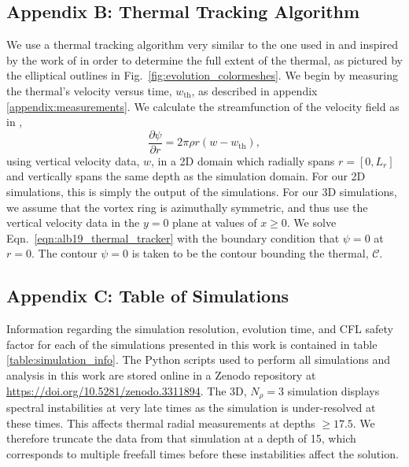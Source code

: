 \subsection{Appendix B: Thermal Tracking Algorithm}
\label{appendix:tracking}
We use a thermal tracking algorithm very similar to the one used in  \citet{lecoanet&jeevanjee2018} and inspired by the work of \citet{romps&all2015} in order to determine the full extent of the thermal, as pictured by the elliptical outlines in Fig.~\ref{fig:evolution_colormeshes}. 
We begin by measuring the thermal's velocity versus time, $w_{\text{th}}$, as described in appendix \ref{appendix:measurements}. 
We calculate the streamfunction of the velocity field as in \citet{romps&all2015},
\begin{equation}
\frac{\partial \psi}{\partial r} = 2\pi \rho r (w - w_{\text{th}}),
\label{eqn:alb19_thermal_tracker}
\end{equation}
using vertical velocity data, $w$, in a 2D domain which radially spans $r = [0, L_r]$ and vertically spans the same depth as the simulation domain.
For our 2D simulations, this is simply the output of the simulations.
For our 3D simulations, we assume that the vortex ring is azimuthally symmetric, and thus use the vertical velocity data in the $y = 0$ plane at values of $x \geq 0$.
We solve Eqn.~\ref{eqn:alb19_thermal_tracker} with the boundary condition that $\psi = 0$ at $r = 0$. 
The contour $\psi = 0$ is taken to be the contour bounding the thermal, $\mathcal{C}$.

\subsection{Appendix C: Table of Simulations}
\label{appendix:table}
Information regarding the simulation resolution, evolution time, and CFL safety factor for each of the simulations presented in this work is contained in table \ref{table:simulation_info}.
The Python scripts used to perform all simulations and analysis in this work are stored online in a Zenodo repository \citep{supp_andersetall2019b} at \url{https://doi.org/10.5281/zenodo.3311894}.
The 3D, $N_\rho = 3$ simulation displays spectral instabilities at very late times as the simulation is under-resolved at these times.
This affects thermal radial measurements at depths $\geq 17.5$.
We therefore truncate the data from that simulation at a depth of 15, which corresponds to multiple freefall times before these instabilities affect the solution.

